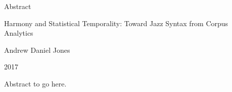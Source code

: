 \centerline{Abstract}

\centerline{Harmony and Statistical Temporality: Toward Jazz Syntax from Corpus Analytics}

\centerline{Andrew Daniel Jones}

\centerline{2017}

Abstract to go here.